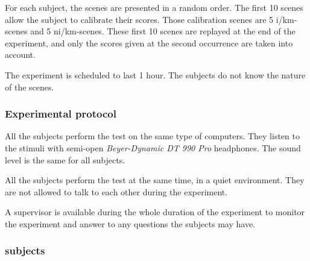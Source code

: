 \documentclass[12pt]{elsarticle}
\begin{document}
For each subject, the scenes are presented in a random order. The first 10 scenes allow the subject to calibrate their scores. Those calibration scenes are  5 i/km-scenes and 5 ni/km-scenes. These first 10 scenes are replayed at the end of the experiment, and only the scores given at the second occurrence are taken into account.

The experiment is scheduled to last 1 hour. The subjects do not know the nature of the scenes.

\subsubsection*{Experimental protocol}


All the subjects perform the test on the same type of computers. They listen to the stimuli with semi-open \emph{Beyer-Dynamic DT 990 Pro} headphones. The sound level is the same for all subjects.


All the subjects perform the test at the same time, in a quiet environment. They are not allowed to talk to each other during the experiment.


A supervisor is available during the whole duration of the experiment to monitor the experiment and answer to any questions the subjects may have.

\subsubsection*{subjects}

\end{document}
